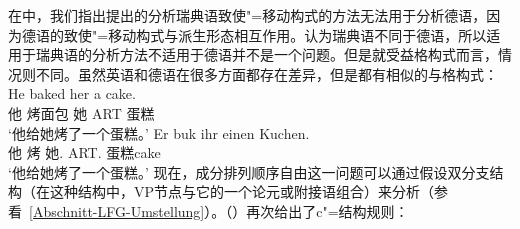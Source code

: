     在\citet{MWArgSt}中，我们指出\citet{ADT2008a,ADT2013a}提出的分析瑞典语致使"=移动构式的方法无法用于分析德语，因为德语的致使"=移动构式与派生形态相互作用。\citet{AT2014a}认为瑞典语不同于德语，所以适用于瑞典语的分析方法不适用于德语并不是一个问题。但是就受益格构式而言，情况则不同。虽然英语和德语在很多方面都存在差异，但是都有相似的与格构式：
\eal
\ex 
\gll He baked her a cake.\\
     他 烤面包 她 ART 蛋糕\\
\glt `他给她烤了一个蛋糕。'
\ex
\label{ex-er-buk-ihr-einen-kuchen} 
\gll Er buk   ihr        einen Kuchen.\\
     他 烤 她.\dat{} ART.\acc{} 蛋糕cake\\
\glt `他给她烤了一个蛋糕。'
\zl
现在，成分排列顺序自由这一问题可以通过假设双分支结构（在这种结构中，VP节点与它的一个论元或附接语组合）来分析（参看~\ref{Abschnitt-LFG-Umstellung}）。（）再次给出了c"=结构规则：
